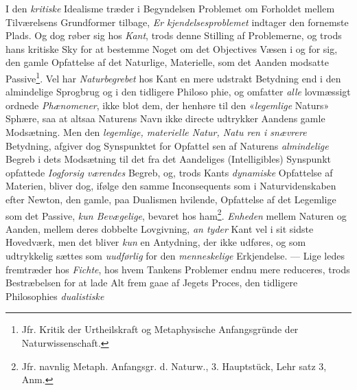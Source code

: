 I den \emph{kritiske} Idealisme træder i Begyndelsen Problemet
om Forholdet mellem Tilværelsens Grundformer tilbage, \emph{Er\-%
kjendelsesproblemet} indtager den fornemste Plads. Og
dog røber sig hos \emph{Kant}, trods denne Stilling af Problemerne,
og trods hans kritiske Sky for at bestemme Noget om det
Objectives Væsen i og for sig, den gamle Opfattelse af det
Naturlige, Materielle, som det Aanden modsatte Passive\footnote{Jfr. Kritik der Urtheilskraft og Metaphysische Anfangsgründe der
Naturwissenschaft.}. Vel
har \emph{Naturbegrebet} hos Kant en mere udstrakt Betydning
end i den almindelige Sprogbrug og i den tidligere Philoso\-%
phie, og omfatter \emph{alle} lovmæssigt ordnede \emph{Phænomener}, ikke
blot dem, der henhøre til den «\emph{legemlige} Naturs» Sphære, saa
at altsaa Naturens Navn ikke directe udtrykker Aandens gamle
Modsætning. Men den \emph{legemlige, materielle Natur, Natu\-%
ren i snævrere} Betydning, afgiver dog Synspunktet for Opfattel\-%
sen af Naturens \emph{almindelige} Begreb i dets Modsætning til det
fra det Aandeliges (Intelligibles) Synspunkt opfattede \emph{Iogforsig\-%
værendes} Begreb, og, trods Kants \emph{dynamiske} Opfattelse af
Materien, bliver dog, ifølge den samme Inconsequents som i
Naturvidenskaben efter Newton, den gamle, paa Dualismen
hvilende, Opfattelse af det Legemlige som det Passive,
\emph{kun Bevægelige}, bevaret hos ham\footnote{Jfr. navnlig Metaph. Anfangsgr. d. Naturw., 3. Hauptstück, Lehr\-%
satz 3, Anm.}. \emph{Enheden} mellem
Naturen og Aanden, mellem deres dobbelte Lovgivning, \emph{an\-%
tyder} Kant vel i sit sidste Hovedværk, men det bliver \emph{kun}
en Antydning, der ikke udføres, og som udtrykkelig sættes
 \setcounter{footnote}{0}
som \emph{uudførlig} for den \emph{menneskelige} Erkjendelse. --- Lige\-%
ledes fremtræder hos \emph{Fichte}, hos hvem Tankens Problemer
endnu mere reduceres, trods Bestræbelsen for at lade Alt frem\-%
gaae af Jegets Proces, den tidligere Philosophies \emph{dualistiske}
